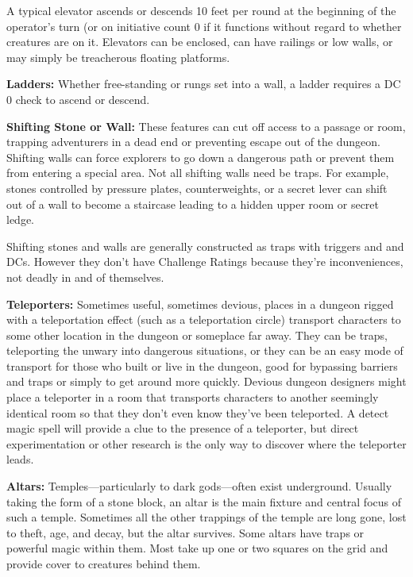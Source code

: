 A typical elevator ascends or descends 10 feet per round at the beginning of the operator's turn (or on initiative count 0 if it functions without regard to whether creatures are on it. Elevators can be enclosed, can have railings or low walls, or may simply be treacherous floating platforms.

\textbf{Ladders:} Whether free-standing or rungs set into a wall, a ladder requires a DC 0  check to ascend or descend.

\textbf{Shifting Stone or Wall:} These features can cut off access to a passage or room, trapping adventurers in a dead end or preventing escape out of the dungeon. Shifting walls can force explorers to go down a dangerous path or prevent them from entering a special area. Not all shifting walls need be traps. For example, stones controlled by pressure plates, counterweights, or a secret lever can shift out of a wall to become a staircase leading to a hidden upper room or secret ledge.

Shifting stones and walls are generally constructed as traps with triggers and  and  DCs. However they don't have Challenge Ratings because they're inconveniences, not deadly in and of themselves.

\textbf{Teleporters:} Sometimes useful, sometimes devious, places in a dungeon rigged with a teleportation effect (such as a teleportation circle) transport characters to some other location in the dungeon or someplace far away. They can be traps, teleporting the unwary into dangerous situations, or they can be an easy mode of transport for those who built or live in the dungeon, good for bypassing barriers and traps or simply to get around more quickly. Devious dungeon designers might place a teleporter in a room that transports characters to another seemingly identical room so that they don't even know they've been teleported. A detect magic spell will provide a clue to the presence of a teleporter, but direct experimentation or other research is the only way to discover where the teleporter leads.

\textbf{Altars:} Temples---particularly to dark gods---often exist underground. Usually taking the form of a stone block, an altar is the main fixture and central focus of such a temple. Sometimes all the other trappings of the temple are long gone, lost to theft, age, and decay, but the altar survives. Some altars have traps or powerful magic within them. Most take up one or two squares on the grid and provide cover to creatures behind them.


